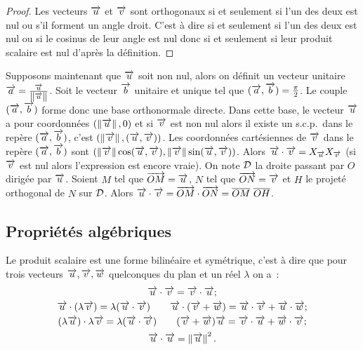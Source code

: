 \begin{proof}
  Les vecteurs \(\vu\) et \(\vv\) sont orthogonaux si et seulement si l'un des 
  deux est nul ou s'il forment un angle droit. C'est à dire si et seulement si 
  l'un des deux est nul ou si le cosinus de leur angle est nul donc si et 
  seulement si leur produit scalaire est nul d'après la définition.
\end{proof}

Supposons maintenant que \(\vu\) soit non nul, alors on définit un vecteur 
unitaire \(\vect{a} = \frac{\vu}{\norme{\vu}}\). Soit le vecteur \(\vect{b}\) 
unitaire et unique tel que \((\vect{a},\vect{b}) = \frac{\pi}{2}\). Le couple 
\((\vect{a},\vect{b})\) forme donc une base orthonormale directe. Dans cette 
base, le vecteur \(\vu\) a pour coordonnées \((\norme{\vu},0)\) et si \(\vv\) 
est non nul alors il existe un s.c.p.\ dans le repère \((\vect{a},\vect{b})\), 
c'est \((\norme{\vv}, (\vu , \vv))\). Les coordonnées cartésiennes de \(\vv\) 
dans le repère \((\vect{a},\vect{b})\) sont \((\norme{\vv}\cos(\vu , 
\vv),\norme{\vv}\sin(\vu , \vv))\). Alors \(\vu \cdot \vv = X_{\vu}X_{\vv}\) (si 
\(\vv\) est nul alors l'expression est encore vraie).  On note \(\Dr\) la droite 
passant par \(O\) dirigée par \(\vu\). Soient \(M\) tel que \(\vect{OM} = \vu\), 
\(N\) tel que \(\vect{ON} = \vv\) et \(H\) le projeté orthogonal de \(N\) sur 
\(\Dr\). Alors \(\vu \cdot \vv = \vect{OM} \cdot \vect{ON}= 
\overline{OM}~\overline{OH}\).

\subsection{Propriétés algébriques}

\begin{prop}
  Le produit scalaire est une forme bilinéaire et symétrique, c'est à dire que 
  pour trois vecteurs \(\vu, \vv, \vw\) quelconques du plan et un réel 
  \(\lambda\) on a~:
  \begin{gather}
    \vu \cdot \vv = \vv \cdot \vu;\\
    \vu \cdot (\lambda \vv) = \lambda (\vu\cdot \vv) \qquad \vu \cdot (\vv + 
    \vw) = \vu \cdot \vv + \vu \cdot \vw;\\
    (\lambda \vu) \cdot \lambda \vv = \lambda (\vu \cdot \vv) \qquad (\vv + \vw) 
    \vu = \vv \cdot \vu + \vw \cdot \vv;\\
    \vu \cdot \vu = \norme{\vu}^2.
  \end{gather}
\end{prop}

